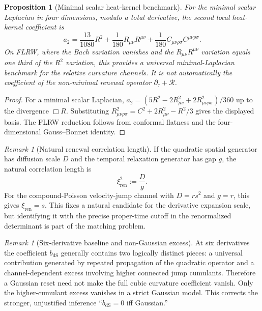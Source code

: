 \documentclass[11pt]{article}
\newtheorem{proposition}[theorem]{Proposition}
\theoremstyle{definition}
\theoremstyle{remark}
\newtheorem{remark}[theorem]{Remark}
\newcommand{\dS}{\mathrm{dS}}
\newcommand{\ren}{\mathrm{ren}}
\begin{document}
\begin{proposition}[Minimal scalar heat-kernel benchmark]
\label{prop:minimal-scalar-heat-kernel}
For the minimal scalar Laplacian in four dimensions, modulo a total derivative,
the second local heat-kernel coefficient is
\[
 a_2=\frac{13}{1080}R^2+\frac1{180}R_{\mu\nu}R^{\mu\nu}
       +\frac1{180}C_{\mu\nu\rho\sigma}C^{\mu\nu\rho\sigma}.
\]
On FLRW, where the Bach variation vanishes and the
$R_{\mu\nu}R^{\mu\nu}$ variation equals one third of the $R^2$ variation,
this provides a universal \emph{minimal-Laplacian benchmark} for the relative
curvature channels.  It is not automatically the coefficient of the
non-minimal renewal operator $\partial_\tau+\mathcal R$.
\end{proposition}

\begin{proof}
For a minimal scalar Laplacian,
$a_2=(5R^2-2R_{\mu\nu}^2+2R_{\mu\nu\rho\sigma}^2)/360$ up to the divergence
$\Box R$.  Substituting
$R_{\mu\nu\rho\sigma}^2=C^2+2R_{\mu\nu}^2-R^2/3$ gives the displayed basis.
The FLRW reduction follows from conformal flatness and the four-dimensional
Gauss--Bonnet identity.
\end{proof}

\begin{remark}[Natural renewal correlation length]
\label{rem:renewal-correlation-length}
If the quadratic spatial generator has diffusion scale $D$ and the temporal
relaxation generator has gap $g$, the natural correlation length is
\[
             \xi_{\ren}^2:=\frac{D}{g}.
\]
For the compound-Poisson velocity-jump channel with $D=rs^2$ and $g=r$, this
gives $\xi_{\ren}=s$.  This fixes a natural candidate for the derivative
expansion scale, but identifying it with the precise proper-time cutoff in the
renormalized determinant is part of the matching problem.
\end{remark}

\begin{remark}[Six-derivative baseline and non-Gaussian excess]
\label{rem:six-derivative-baseline}
At six derivatives the coefficient $b_{\dS}$ generally contains two logically
distinct pieces: a universal contribution generated by repeated propagation of
the quadratic operator and a channel-dependent excess involving higher connected
jump cumulants.  Therefore a Gaussian reset need not make the full cubic
curvature coefficient vanish.  Only the higher-cumulant excess vanishes in a
strict Gaussian model.  This corrects the stronger, unjustified inference
``$b_{\dS}=0$ iff Gaussian.''
\end{remark}
\end{document}
